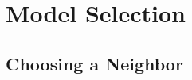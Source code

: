\section{Model Selection}
\label{sec:model-selection}
	
	\subsection{Choosing a Neighbor}
	\label{ssec:choosing-a-neighbor}
	
		
	

